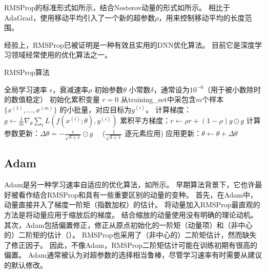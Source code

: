 RMSProp的标准形式如所示，结合Nesterov动量的形式如所示。
相比于AdaGrad，使用移动平均引入了一个新的超参数$\rho$，用来控制移动平均的长度范围。

经验上，RMSProp已被证明是一种有效且实用的DNN优化算法。
目前它是深度学习领域经常使用的优化算法之一。\par

\begin{algorithm}[ht]
	\caption{RMSProp算法}
	\label{alg:rms_prop}
	\begin{algorithmic}
		\REQUIRE 全局学习速率 $\epsilon$，衰减速率$\rho$
		\REQUIRE  初始参数$\theta$
		\REQUIRE 小常数$\delta$，通常设为$10^{-6}$（用于被小数除时的数值稳定）
		\STATE 初始化累积变量 $r = 0$
		\STATE 从\gls{training_set}中采包含$m$个样本$\{ x^{(1)},\dots, x^{(m)}\}$ 的小批量，对应目标为$y^{(i)}$。
		\STATE 计算梯度：$g \leftarrow  
		\frac{1}{m} \nabla_{\theta} \sum_i L(f(x^{(i)};\theta),y^{(i)})$ 
		\STATE 累积平方梯度：$r \leftarrow \rho
		r + (1-\rho) g \odot g$
		\STATE 计算参数更新：$\Delta \theta =
		-\frac{\epsilon}{\sqrt{\delta + r}} \odot g$  \ \  ($\frac{1}{\sqrt{\delta + r}}$ 逐元素应用)
		\STATE 应用更新：$\theta \leftarrow \theta + \Delta \theta$
		\ENDWHILE
	\end{algorithmic}
\end{algorithm}

\subsection{Adam}
\label{sec:adam}
Adam是另一种学习速率自适应的优化算法，如所示。
早期算法背景下，它也许最好被看作结合RMSProp和具有一些重要区别的动量的变种。
首先，在Adam中，动量直接并入了梯度一阶矩（指数加权）的估计。
将动量加入RMSProp最直观的方法是将动量应用于缩放后的梯度。
结合缩放的动量使用没有明确的理论动机。
其次，Adam包括偏置修正，修正从原点初始化的一阶矩（动量项）和（非中心的）二阶矩的估计（）。
RMSProp也采用了（非中心的）二阶矩估计，然而缺失了修正因子。
因此，不像Adam，RMSProp二阶矩估计可能在训练初期有很高的偏置。
Adam通常被认为对超参数的选择相当鲁棒，尽管学习速率有时需要从建议的默认修改。\par

